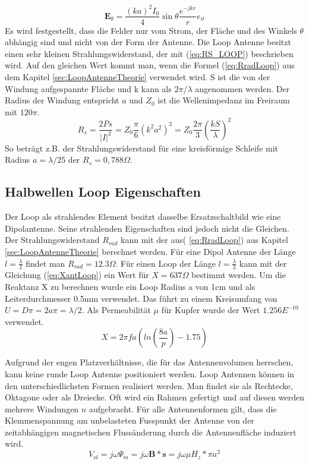\begin{equation}
\textbf{E}_{\theta}=\dfrac{(ka)^2I_{0}}{4}\sin \theta \dfrac{e^{-jkr}}{r} e_{\vartheta}
\end{equation}
Es wird festgestellt, dass die Felder nur vom Strom, der Fläche und des Winkels $\theta$ abhängig sind
und nicht von der Form der Antenne. 
Die Loop Antenne besitzt einen sehr kleinen Strahlungswiderstand, der mit (\ref{eq:RS_LOOP}) beschrieben wird. Auf den gleichen Wert kommt man, wenn die Formel (\ref{eq:RradLoop}) aus dem Kapitel \ref{sec:LoopAntenneTheorie} verwendet wird. S ist die von der Windung aufgespannte Fläche und k kann als $2\pi/\lambda$ angenommen werden. Der Radius der Windung entspricht $a$ und $Z_0$ ist die Wellenimpedanz im Freiraum mit $120\pi$.
\begin{equation}\label{eq:RS_LOOP}
R_{s}=\dfrac{2Ps}{|I|^{2}}=Z_{0}\dfrac{\pi}{6}(k^{2}a^{2})^{2}=Z_{0}\dfrac{2\pi}{3}\left(\dfrac{kS}{\lambda}\right)^{2} 
\end{equation}
So beträgt z.B. der Strahlungswiderstand für eine kreisförmige Schleife mit Radius $a = \lambda/25$ der  $R_{s} = 0,788\Omega$.


\subsection{Halbwellen Loop Eigenschaften}
Der Loop als strahlendes Element besitzt dasselbe Ersatzschaltbild wie eine Dipolantenne. Seine strahlenden Eigenschaften sind jedoch nicht die Gleichen. Der Strahlungswiderstand $R_{rad}$ kann mit der aus( \ref{eq:RradLoop}) aus Kapitel \ref{sec:LoopAntenneTheorie} berechnet werden. Für eine Dipol Antenne der Länge $l=\frac{\lambda}{2}$ findet man $R_{rad} = 12.3\Omega$. Für einen Loop der Länge $l=\frac{\lambda}{2}$ kann mit der Gleichung (\ref{eq:XantLoop}) ein Wert für $X = 637 \Omega$ bestimmt werden. Um die Reaktanz X zu berechnen wurde ein Loop Radius a von 1cm und als Leiterdurchmesser 0.5mm verwendet. Das führt zu einem Kreisumfang von $U=D\pi=2a\pi=\lambda /2$. Als Permeabilität $\mu $ für Kupfer wurde der Wert $1.256E^{-10}$ verwendet.
\begin{equation}\label{eq:XantLoop}
X= 2\pi f a(ln \left( \frac{8a}{p} \right) - 1.75)
\end{equation}

Aufgrund der engen Platzverhältnisse, die für das Antennenvolumen herrschen, kann keine runde Loop Antenne positioniert werden. Loop Antennen können in den unterschiedlichsten Formen realisiert werden. Man findet sie als Rechtecke, Oktagone oder als Dreiecke. Oft wird ein Rahmen gefertigt und auf diesen  werden mehrere Windungen $n$ aufgebracht. Für alle Antennenformen gilt, dass die Klemmenspannung am unbelasteten Fusspunkt der Antenne von der zeitabhängigen magnetischen Flussänderung durch die Antennenfläche induziert wird.
\begin{equation}\label{eq:InduktionspannungLoop}
V_{ol}= j\omega\Psi_{m}=j\omega\textbf{B}*\textbf{s}= j\omega\mu H_{z}*\pi a^{2}
\end{equation}

